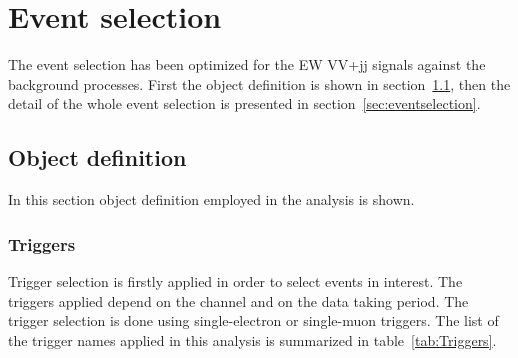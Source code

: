 \chapter{Event selection}
\label{chap:eventselection}
The event selection has been optimized for the EW VV+jj signals against the background processes.
First the object definition is shown in section~\ref{sec:object}, then the detail of the whole event selection is presented in section~\ref{sec:eventselection}.
\section{Object definition}
\label{sec:object}
In this section object definition employed in the analysis is shown.
\subsection{Triggers}
Trigger selection is firstly applied in order to select events in interest.
The triggers applied depend on the channel and on the data taking period. 
The trigger selection is done using single-electron or single-muon triggers.
The list of the trigger names applied in this analysis is summarized in table~\ref{tab:Triggers}.
